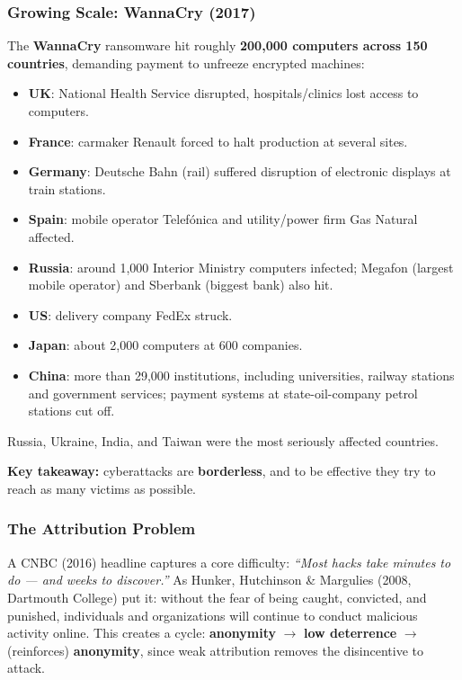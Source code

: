 \documentclass[12pt, a4paper]{article}
\begin{document}
\subsubsection{Growing Scale: WannaCry (2017)}
The \textbf{WannaCry} ransomware hit roughly \textbf{200{,}000 computers across 150 countries}, demanding payment to unfreeze encrypted machines:
\begin{itemize}
    \item \textbf{UK}: National Health Service disrupted, hospitals/clinics lost access to computers.
    \item \textbf{France}: carmaker Renault forced to halt production at several sites.
    \item \textbf{Germany}: Deutsche Bahn (rail) suffered disruption of electronic displays at train stations.
    \item \textbf{Spain}: mobile operator Telefónica and utility/power firm Gas Natural affected.
    \item \textbf{Russia}: around 1{,}000 Interior Ministry computers infected; Megafon (largest mobile operator) and Sberbank (biggest bank) also hit.
    \item \textbf{US}: delivery company FedEx struck.
    \item \textbf{Japan}: about 2{,}000 computers at 600 companies.
    \item \textbf{China}: more than 29{,}000 institutions, including universities, railway stations and government services; payment systems at state-oil-company petrol stations cut off.
\end{itemize}
Russia, Ukraine, India, and Taiwan were the most seriously affected countries.

\textcolor{red!70!black}{\textbf{Key takeaway:}} cyberattacks are \textbf{borderless}, and to be effective they try to reach as many victims as possible.

\subsubsection{The Attribution Problem}
A CNBC (2016) headline captures a core difficulty: \emph{``Most hacks take minutes to do — and weeks to discover.''} As Hunker, Hutchinson \& Margulies (2008, Dartmouth College) put it: without the fear of being caught, convicted, and punished, individuals and organizations will continue to conduct malicious activity online. This creates a cycle: \textbf{anonymity} $\rightarrow$ \textbf{low deterrence} $\rightarrow$ (reinforces) \textbf{anonymity}, since weak attribution removes the disincentive to attack.
\end{document}
